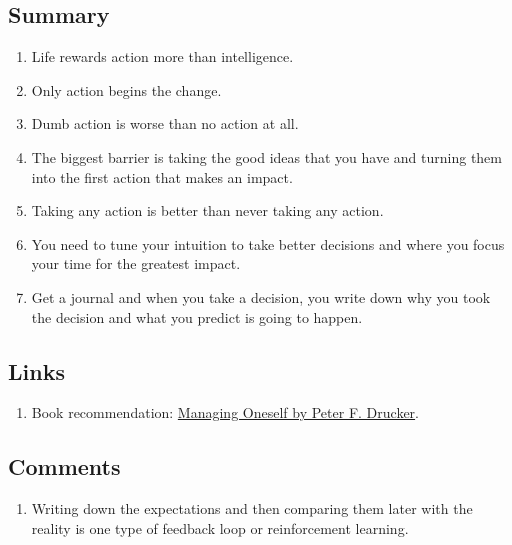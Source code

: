 \documentclass[a4paper,12pt]{article}
\begin{document}
\subsection*{ Summary }

\begin{enumerate}

	\item Life rewards action more than intelligence.

	\item Only action begins the change.

	\item Dumb action is worse than no action at all.

	\item The biggest barrier is taking the good ideas that you have and turning them into the first action that makes an impact.

	\item Taking any action is better than never taking any action.

	\item You need to tune your intuition to take better decisions and where you focus your time for the greatest impact.

	\item Get a journal and when you take a decision, you write down why you took the decision and what you predict is going to happen.

\end{enumerate}



\subsection*{ Links }

\begin{enumerate}

	\item Book recommendation: \href{https://www.goodreads.com/book/show/2477223.Managing_Oneself}{Managing Oneself by Peter F. Drucker}.

\end{enumerate}


\subsection*{ Comments }

\begin{enumerate}

	\item Writing down the expectations and then comparing them later with the reality is one type of feedback loop or reinforcement learning.

\end{enumerate}



\newpage
\end{document}
